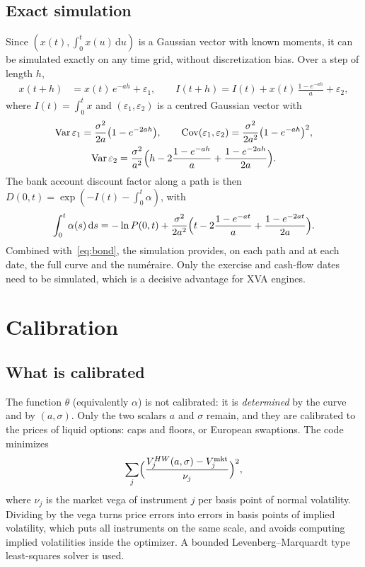 \documentclass[11pt,a4paper]{article}
\theoremstyle{plain}
\theoremstyle{definition}
\newcommand{\dd}{\mathrm{d}}
\DeclareMathOperator{\Var}{Var}
\DeclareMathOperator{\Cov}{Cov}
\begin{document}
\subsection{Exact simulation}
Since $(x(t),\int_0^tx(u)\,\dd u)$ is a Gaussian vector with known moments, it can be simulated exactly on any time grid, without discretization bias. Over a step of length $h$,
\begin{align}
    x(t+h)&=x(t)\,e^{-ah}+\varepsilon_1,
    \qquad
    I(t+h)=I(t)+x(t)\,\frac{1-e^{-ah}}{a}+\varepsilon_2,
    \label{eq:exact}
\end{align}
where $I(t)=\int_0^tx$ and $(\varepsilon_1,\varepsilon_2)$ is a centred Gaussian vector with
\begin{equation}
\begin{gathered}
    \Var\varepsilon_1=\frac{\sigma^2}{2a}\bigl(1-e^{-2ah}\bigr),\qquad
    \Cov(\varepsilon_1,\varepsilon_2)=\frac{\sigma^2}{2a^2}\bigl(1-e^{-ah}\bigr)^2,\\
    \Var\varepsilon_2=\frac{\sigma^2}{a^2}\Bigl(h-2\frac{1-e^{-ah}}{a}+\frac{1-e^{-2ah}}{2a}\Bigr).
\end{gathered}
\end{equation}
The bank account discount factor along a path is then $D(0,t)=\exp(-I(t)-\int_0^t\alpha)$, with
\begin{equation}
    \int_0^t\alpha(s)\,\dd s=-\ln P(0,t)+\frac{\sigma^2}{2a^2}\Bigl(t-2\frac{1-e^{-at}}{a}+\frac{1-e^{-2at}}{2a}\Bigr).
\end{equation}
Combined with~\eqref{eq:bond}, the simulation provides, on each path and at each date, the full curve and the numéraire. Only the exercise and cash-flow dates need to be simulated, which is a decisive advantage for XVA engines.

\clearpage
\section{Calibration}
\label{sec:calibration}

\subsection{What is calibrated}
The function $\theta$ (equivalently $\alpha$) is not calibrated: it is \emph{determined} by the curve and by $(a,\sigma)$. Only the two scalars $a$ and $\sigma$ remain, and they are calibrated to the prices of liquid options: caps and floors, or European swaptions. The code minimizes
\begin{equation}
    \sum_{j}\Bigl(\frac{V_j^{HW}(a,\sigma)-V_j^{\text{mkt}}}{\nu_j}\Bigr)^2,
    \label{eq:calib}
\end{equation}
where $\nu_j$ is the market vega of instrument $j$ per basis point of normal volatility. Dividing by the vega turns price errors into errors in basis points of implied volatility, which puts all instruments on the same scale, and avoids computing implied volatilities inside the optimizer. A bounded Levenberg--Marquardt type least-squares solver is used.
\end{document}
